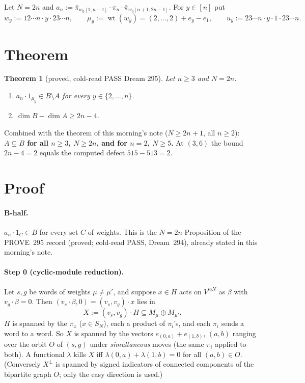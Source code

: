 \documentclass[11pt]{amsart}
\newcommand{\gr}[1]{\textsf{#1}}
\newcommand{\pb}{\bar\pi}
\newcommand{\wo}{w_0}
\newcommand{\wt}{\operatorname{wt}}
\theoremstyle{plain}
\newtheorem{theorem}{Theorem}
\theoremstyle{definition}
\begin{document}
Let $N=2n$ and $a_n:=\pb_{\wo[1,n-1]}\cdot\pi_n\cdot\pb_{\wo[n+1,2n-1]}$. For $y\in[n]$ put
\[
w_y:=12\cdots n\cdot y\cdot 23\cdots n,\qquad \mu_y:=\wt(w_y)=(2,\dots,2)+e_y-e_1,\qquad u_y:=23\cdots n\cdot y\cdot1\cdot23\cdots n.
\]

\section{Theorem}
\begin{theorem}[\gr{proved, cold-read PASS Dream 295}]\label{thm:main}
Let $n\ge3$ and $N=2n$.
\begin{enumerate}[label=(\arabic*),itemsep=0pt]
\item $a_n\cdot1_{\mu_y}\in B\setminus A$ for every $y\in\{2,\dots,n\}$.
\item $\dim B-\dim A\ge 2n-4$.
\end{enumerate}
\end{theorem}
Combined with the theorem of this morning's note ($N\ge2n+1$, all $n\ge2$): \textbf{$A\subsetneq B$ for all $n\ge3$, $N\ge2n$, and for $n=2$, $N\ge5$.} At $(3,6)$ the bound $2n-4=2$ equals the computed defect $515-513=2$.

\section{Proof}
\paragraph{B-half.} $a_n\cdot1_C\in B$ for every set $C$ of weights. This is the $N=2n$ Proposition of the PROVE~295 record (proved; cold-read PASS, Dream~294), already stated in this morning's note.

\paragraph{Step 0 (cyclic-module reduction).} Let $s,g$ be words of weights $\mu\neq\mu'$, and suppose $x\in H$ acts on $V^{\otimes N}$ as $\beta$ with $v_g\cdot\beta=0$. Then $(v_s\cdot\beta,0)=(v_s,v_g)\cdot x$ lies in
\[X:=(v_s,v_g)\cdot H\subseteq M_\mu\oplus M_{\mu'}.\]
$H$ is spanned by the $\pi_x$ ($x\in S_N$), each a product of $\pi_i$'s, and each $\pi_i$ sends a word to a word. So $X$ is spanned by the vectors $e_{(0,a)}+e_{(1,b)}$, $(a,b)$ ranging over the orbit $O$ of $(s,g)$ under \emph{simultaneous} moves (the same $\pi_i$ applied to both). A functional $\lambda$ kills $X$ iff $\lambda(0,a)+\lambda(1,b)=0$ for all $(a,b)\in O$. (Conversely $X^\perp$ is spanned by signed indicators of connected components of the bipartite graph $O$; only the easy direction is used.)
\end{document}
